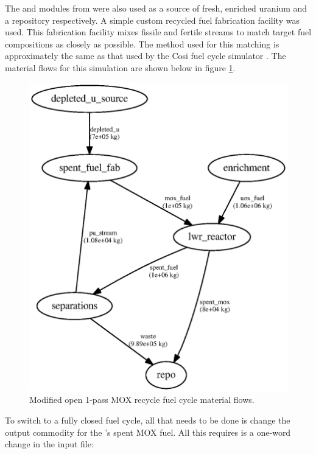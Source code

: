 The  and  modules from \Cycamore were also used as a
source of fresh, enriched uranium and a repository respectively. A simple
custom recycled fuel fabrication facility was used.  This fabrication facility
mixes fissile and fertile streams to match target fuel compositions as closely
as possible.  The method used for this matching is approximately the same as
that used by the Cosi fuel cycle simulator . The material flows for this simulation are shown below in figure
\ref{fig:flowmodopen}.

\begin{figure}[H]
\label{fig:flowmodopen}
\caption{Modified open 1-pass MOX recycle fuel cycle material flows.}
\begin{center}
\includegraphics{./images/flow-mod-open-1.eps}
\end{center}
\end{figure}

To switch to a fully closed fuel cycle, all that needs to be done is change
the output commodity for the 's spent MOX fuel.  All this
requires is a one-word change in the input file: 

